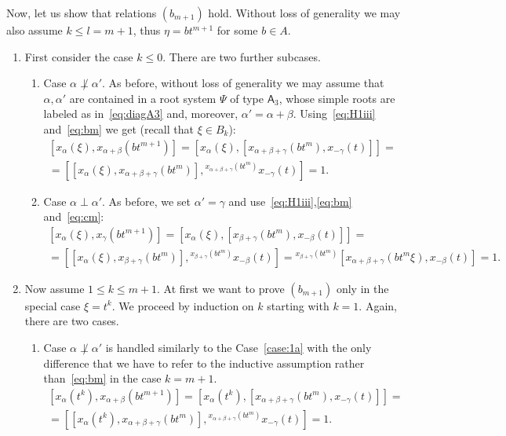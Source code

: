\documentclass[oneside, 10pt]{amsart}
\theoremstyle{remark}
\begin{document}
Now, let us show that relations $(b_{m+1})$ hold. 
Without loss of generality we may also assume $k \leq l=m+1$, thus $\eta = bt^{m+1}$ for some $b\in A$.

\begin{enumerate}
\item \label{case:1} First consider the case $k \leq 0$. There are two further subcases.
 \begin{enumerate}
  \item \label{case:1a} Case $\alpha \not \perp \alpha'$. 
  As before, without loss of generality we may assume that $\alpha, \alpha'$ are contained in a root system $\Psi$ of type $\mathsf{A}_3$,
   whose simple roots are labeled as in~\eqref{eq:diagA3} and, moreover, $\alpha'=\alpha + \beta$.
  Using~\eqref{eq:H1iii} and~\eqref{eq:bm} we get (recall that $\xi \in B_k$):
   \begin{multline} \nonumber
   [x_\alpha(\xi), x_{\alpha+\beta}(bt^{m+1})] = [x_\alpha(\xi), [x_{\alpha+\beta+\gamma}(bt^m), x_{-\gamma}(t)]] = \\   
  = [[x_\alpha(\xi), x_{\alpha+\beta+\gamma}(bt^m)], {}^{x_{\alpha+\beta+\gamma}(bt^m)}\!x_{-\gamma}(t)] = 1.
  \end{multline}
  \item Case $\alpha \perp \alpha'$. As before, we set $\alpha' = \gamma$ and use~\eqref{eq:H1iii},\eqref{eq:bm} and~\eqref{eq:cm}:
  \begin{multline} \nonumber
   [x_\alpha(\xi), x_{\gamma}(bt^{m+1})] = [x_\alpha(\xi), [x_{\beta+\gamma}(bt^m), x_{-\beta}(t)]] = \\   
  = [[x_\alpha(\xi), x_{\beta+\gamma}(bt^m)], {}^{x_{\beta+\gamma}(bt^m)}\!x_{-\beta}(t)] = {}^{x_{\beta+\gamma}(bt^m)}\![x_{\alpha+\beta+\gamma}(bt^m\xi), x_{-\beta}(t)] = 1.
  \end{multline}
 \end{enumerate} 
  
\item \label{case:2} Now assume $1 \leq k \leq m+1$. 
At first we want to prove $(b_{m+1})$ only in the special case $\xi=t^k$.
We proceed by induction on $k$ starting with $k=1$.
Again, there are two cases.
\begin{enumerate}
 \item \label{case:2a} Case $\alpha\not\perp\alpha'$ is handled similarly to the Case~\eqref{case:1a} with the only
  difference that we have to refer to the inductive assumption rather than~\eqref{eq:bm} in the case $k=m+1$.
  \begin{multline} \nonumber
   [x_\alpha(t^k), x_{\alpha+\beta}(bt^{m+1})] = [x_\alpha(t^k), [x_{\alpha+\beta+\gamma}(bt^m), x_{-\gamma}(t)]] = \\   
  = [[x_\alpha(t^k), x_{\alpha+\beta+\gamma}(bt^m)], {}^{x_{\alpha+\beta+\gamma}(bt^m)}\!x_{-\gamma}(t)] = 1.
  \end{multline}


\end{enumerate}
\end{enumerate}
\end{document}

